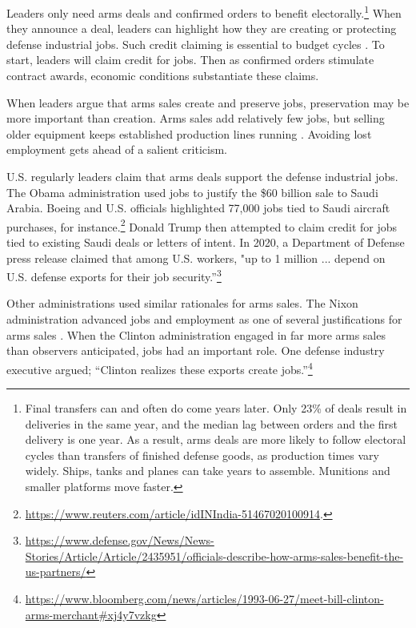 \documentclass[12pt]{article}
\begin{document}
Leaders only need arms deals and confirmed orders to benefit electorally.\footnote{Final transfers can and often do come years later. 
Only 23\% of deals result in deliveries in the same year, and the median lag between orders and the first delivery is one year. 
As a result, arms deals are more likely to follow electoral cycles than transfers of finished defense goods, as production times vary widely. 
Ships, tanks and planes can take years to assemble.
Munitions and smaller platforms move faster.}
When they announce a deal, leaders can highlight how they are creating or protecting defense industrial jobs. 
Such credit claiming is essential to budget cycles \citep{Bueno2021}. 
To start, leaders will claim credit for jobs.
Then as confirmed orders stimulate contract awards, economic conditions substantiate these claims. 


When leaders argue that arms sales create and preserve jobs, preservation may be more important than creation. 
Arms sales add relatively few jobs, but selling older equipment keeps established production lines running \citep{Caverley2018}. 
Avoiding lost employment gets ahead of a salient criticism. 


U.S. regularly leaders claim that arms deals support the defense industrial jobs. 
The Obama administration used jobs to justify the \$60 billion sale to Saudi Arabia.
Boeing and U.S. officials highlighted 77,000 jobs tied to Saudi aircraft purchases, for instance.\footnote{\url{https://www.reuters.com/article/idINIndia-51467020100914}.}
Donald Trump then attempted to claim credit for jobs tied to existing Saudi deals or letters of intent. 
In 2020, a Department of Defense press release claimed that among U.S. workers, "up to 1 million ... depend on U.S. defense exports for their job security.''\footnote{\url{https://www.defense.gov/News/News-Stories/Article/Article/2435951/officials-describe-how-arms-sales-benefit-the-us-partners/}}


Other administrations used similar rationales for arms sales.
The Nixon administration advanced jobs and employment as one of several justifications for arms sales \citep[pg. 34]{Sorley1983}. 
When the Clinton administration engaged in far more arms sales than observers anticipated, jobs had an important role.
One defense industry executive argued; ``Clinton realizes these exports create jobs.''\footnote{\url{https://www.bloomberg.com/news/articles/1993-06-27/meet-bill-clinton-arms-merchant\#xj4y7vzkg}}
\end{document}
